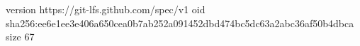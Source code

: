 version https://git-lfs.github.com/spec/v1
oid sha256:ee6e1ee3e406a650cea0b7ab252a091452dbd474bc5dc63a2abc36af50b4dbca
size 67
